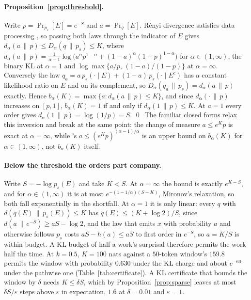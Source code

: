 \paragraph{Proposition~\ref{prop:threshold}.}
Write $p = \Pr_{p_s}[E] = e^{-S}$ and $a = \Pr_q[E]$. R\'enyi divergence satisfies data processing
\citep{vanerven2014renyi}, so passing both laws through the indicator of $E$ gives
$d_\alpha(a\,\|\,p) \le D_\alpha(q\,\|\,p_s) \le K$, where
$d_\alpha(a\,\|\,p) = \frac{1}{\alpha-1}\log\bigl(a^{\alpha}p^{1-\alpha} + (1-a)^{\alpha}(1-p)^{1-\alpha}\bigr)$
for $\alpha \in (1,\infty)$, the binary KL at $\alpha = 1$ and $\log\max\{a/p,\,(1-a)/(1-p)\}$ at
$\alpha = \infty$. Conversely the law $q_a = a\,p_s(\cdot \mid E) + (1-a)\,p_s(\cdot \mid E^{c})$ has a
constant likelihood ratio on $E$ and on its complement, so $D_\alpha(q_a\,\|\,p_s) = d_\alpha(a\,\|\,p)$
exactly. Hence $b_\alpha(K) = \max\{a : d_\alpha(a\,\|\,p) \le K\}$, and since $d_\alpha(\cdot\,\|\,p)$
increases on $[p,1]$, $b_\alpha(K) = 1$ if and only if $d_\alpha(1\,\|\,p) \le K$. At $a = 1$ every order
gives $d_\alpha(1\,\|\,p) = \log(1/p) = S$. \qed\ The familiar closed forms relax this inversion and break
at the same point: the change of measure $a \le e^{K}p$ is exact at $\alpha = \infty$, while
\citet{mironov2017renyi}'s $a \le (e^{K}p)^{(\alpha-1)/\alpha}$ is an upper bound on $b_\alpha(K)$ for
$\alpha \in (1,\infty)$, not $b_\alpha(K)$ itself.

\paragraph{Below the threshold the orders part company.}\label{app:belowthreshold}
Write $S = -\log p_s(E)$ and take $K < S$. At $\alpha = \infty$ the bound is exactly $e^{K-S}$, and for
$\alpha \in (1,\infty)$ it is at most $e^{-(1-1/\alpha)(S-K)}$, Mironov's relaxation, so both fall
exponentially in the shortfall. At $\alpha = 1$
it is only linear: every $q$ with $d(q(E) \,\|\, p_s(E)) \le K$ has $q(E) \le (K + \log 2)/S$, since
$d(a \,\|\, e^{-S}) \ge aS - \log 2$, and the law that emits $x$ with probability $a$ and otherwise follows
$p_s$ costs $aS - h(a) \le aS$ to first order in $e^{-S}$, so $a = K/S$ is within budget. A KL budget of
half a work's surprisal therefore permits the work half the time. At $k = 0.5$, $K = 100$ nats against a
$50$-token window's $159.8$ permits the window with probability $0.630$ under the KL charge and about $e^{-60}$ under the pathwise one (Table~\ref{tab:certificate}). A KL certificate that bounds
the window by $\delta$ needs $K \le \delta S$, which by Proposition~\ref{prop:sparse} leaves at most
$\delta S/\varepsilon$ steps above $\varepsilon$ in expectation, $1.6$ at $\delta = 0.01$ and $\varepsilon = 1$.

